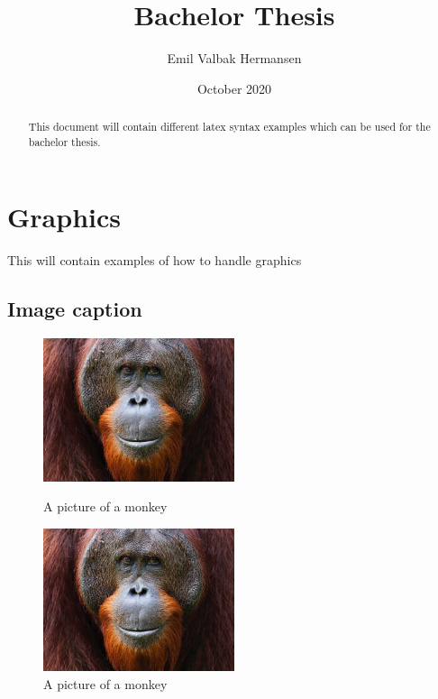 \documentclass[a4paper]{report}
\title{Bachelor Thesis}
\author{Emil Valbak Hermansen}
\date{October 2020}
\begin{document}
\listoftodos
\begin{abstract}
    This document will contain different latex syntax examples which can be used for the bachelor thesis. 
\end{abstract}

\maketitle
\tableofcontents

\chapter{Graphics}
    This will contain examples of how to handle graphics

    \section{Image caption}
        \begin{figure}[h]
            \caption{A picture of a monkey}
            \centering
              \includegraphics[width=0.5\textwidth]{abe.jpg}
              \label{fig:monkey_cap_upper}
        \end{figure}

        \begin{figure}[h]
            \centering
            \includegraphics[width=0.5\textwidth]{abe.jpg}
            \caption{A picture of a monkey}
            \label{fig:monkey_cap_bottom}
        \end{figure}
\end{document}
